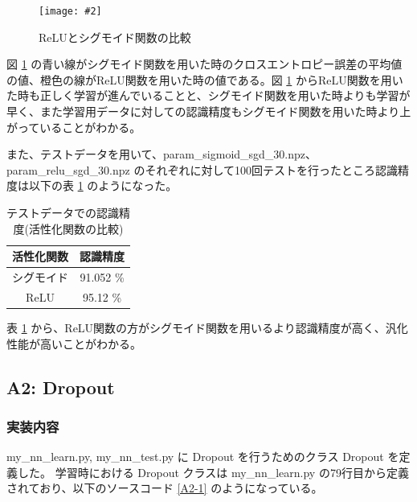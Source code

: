 \documentclass[a4paper,dvipdfmx]{jsarticle}
\newcommand{\image}[3]{
    \begin{figure}[H]
        \begin{center}
        \texttt{[image: \#2]}
        \end{center}
        \caption{#1}
        \label{#3}
    \end{figure}
}
\begin{document}
\image{ReLUとシグモイド関数の比較}{report_a1-1.png}{fig-A-1-1}

図 \ref{fig-A-1-1} の青い線がシグモイド関数を用いた時のクロスエントロピー誤差の平均値の値、橙色の線がReLU関数を用いた時の値である。図 \ref{fig-A-1-1} からReLU関数を用いた時も正しく学習が進んでいることと、シグモイド関数を用いた時よりも学習が早く、また学習用データに対しての認識精度もシグモイド関数を用いた時より上がっていることがわかる。

また、テストデータを用いて、param\_sigmoid\_sgd\_30.npz、param\_relu\_sgd\_30.npz のそれぞれに対して100回テストを行ったところ認識精度は以下の表 \ref{table-A1-1} のようになった。

\begin{table}[H]
\begin{center}
\caption{テストデータでの認識精度(活性化関数の比較)}
  \begin{tabular}{|c|c|} \hline
    活性化関数 & 認識精度  \\ \hline \hline
    シグモイド & 91.052 \%  \\ \hline
    ReLU & 95.12 \% \\ \hline
  \end{tabular}
	\label{table-A1-1}
\end{center}
\end{table}

表 \ref{table-A1-1} から、ReLU関数の方がシグモイド関数を用いるより認識精度が高く、汎化性能が高いことがわかる。

\subsection*{A2: Dropout}

\subsubsection*{実装内容}

my\_nn\_learn.py, my\_nn\_test.py に Dropout を行うためのクラス Dropout を定義した。
学習時における Dropout クラスは my\_nn\_learn.py の79行目から定義されており、以下のソースコード \ref{A2-1} のようになっている。
\end{document}
